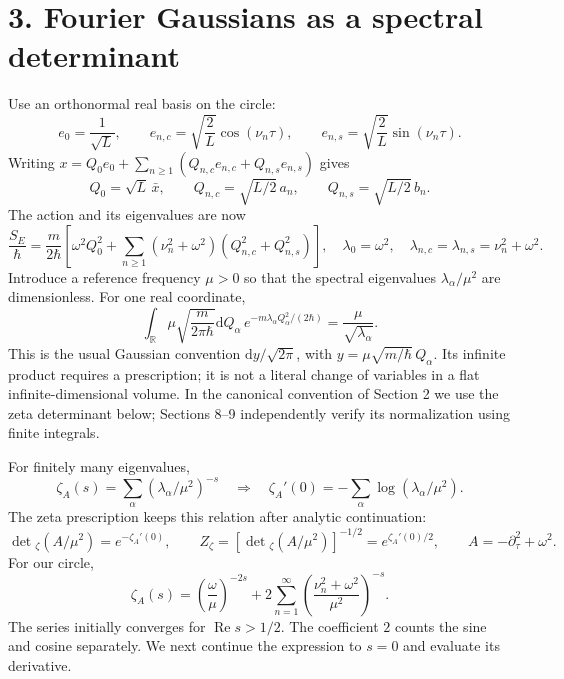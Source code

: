\documentclass[11pt,letterpaper]{article}
\newcommand{\dd}{\mathrm{d}}
\begin{document}
\newpage
\section*{3. Fourier Gaussians as a spectral determinant}
Use an orthonormal real basis on the circle:
\[
 e_0=\frac{1}{\sqrt L},\qquad
 e_{n,c}=\sqrt{\frac2L}\cos(\nu_n\tau),\qquad
 e_{n,s}=\sqrt{\frac2L}\sin(\nu_n\tau).
\]
Writing $x=Q_0e_0+\sum_{n\geq1}(Q_{n,c}e_{n,c}+Q_{n,s}e_{n,s})$ gives
\[
 Q_0=\sqrt L\,\bar x,\qquad Q_{n,c}=\sqrt{L/2}\,a_n,
 \qquad Q_{n,s}=\sqrt{L/2}\,b_n.
\]
The action and its eigenvalues are now
\begin{equation}
 \frac{S_E}{\hbar}=\frac{m}{2\hbar}
 \left[\omega^2Q_0^2+\sum_{n\geq1}(\nu_n^2+\omega^2)
 (Q_{n,c}^2+Q_{n,s}^2)\right],\quad
 \lambda_0=\omega^2,\quad\lambda_{n,c}=\lambda_{n,s}=\nu_n^2+\omega^2.
\end{equation}
Introduce a reference frequency $\mu>0$ so that the spectral eigenvalues
$\lambda_\alpha/\mu^2$ are dimensionless. For one real coordinate,
\begin{equation}
 \int_{\mathbb R}\mu\sqrt{\frac{m}{2\pi\hbar}}\dd Q_\alpha\,
 e^{-m\lambda_\alpha Q_\alpha^2/(2\hbar)}
 =\frac{\mu}{\sqrt{\lambda_\alpha}}.
 \label{eq:one-gaussian}
\end{equation}
This is the usual Gaussian convention $\dd y/\sqrt{2\pi}$, with
$y=\mu\sqrt{m/\hbar}\,Q_\alpha$. Its infinite product requires a prescription;
it is not a literal change of variables in a flat infinite-dimensional volume.
In the canonical convention of Section 2 we use the zeta determinant below;
Sections 8--9 independently verify its normalization using finite integrals.

For finitely many eigenvalues,
\[
 \zeta_A(s)=\sum_\alpha(\lambda_\alpha/\mu^2)^{-s}
 \quad\Longrightarrow\quad
 \zeta_A'(0)=-\sum_\alpha\log(\lambda_\alpha/\mu^2).
\]
The zeta prescription keeps this relation after analytic continuation:
\begin{equation}
 \boxed{\det{}_{\zeta}(A/\mu^2)=e^{-\zeta_A'(0)},\qquad
 Z_\zeta=[\det{}_{\zeta}(A/\mu^2)]^{-1/2}=e^{\zeta_A'(0)/2},}
 \qquad A=-\partial_\tau^2+\omega^2.
\end{equation}
For our circle,
\begin{equation}
 \zeta_A(s)=\left(\frac\omega\mu\right)^{-2s}
 +2\sum_{n=1}^{\infty}
 \left(\frac{\nu_n^2+\omega^2}{\mu^2}\right)^{-s}.
 \label{eq:spectral-zeta}
\end{equation}
The series initially converges for $\operatorname{Re}s>1/2$.
The coefficient $2$ counts the sine and cosine separately. We next continue
the expression to $s=0$ and evaluate its derivative.
\end{document}
